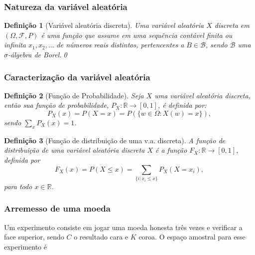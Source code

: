 \documentclass{beamer}
\theoremstyle{plain}
\newtheorem{defi}{Definição}
\begin{document}
\begin{frame}
	\frametitle{Natureza da variável aleatória}
	\begin{defi}[Variável aleatória discreta]
		Uma variável aleatória $X$ discreta em $(\Omega, \mathcal{F}, P)$ é uma função que assume em uma sequência contável finita ou infinita $x_1,x_2,\ldots$ de números reais distintos, pertencentes a $B\in\mathcal{B}$, sendo $\mathcal{B}$ uma $\sigma$-álgebra de Borel.\qed
	\end{defi}
\end{frame}

\begin{frame}
	\frametitle{Caracterização da variável aleatória}
	\begin{defi}[Função de Probabilidade]
		Seja $X$ uma variável aleatória discreta, então sua função de probabilidade, $P_X:\mathbb{R}\rightarrow [0,1]$, é definida por:
		$$
		P_X(x)=P(X=x)=P(\{w\in\Omega:X(w)=x\}),
		$$
		sendo $\sum_xP_X(x)=1$.
	\end{defi}
\end{frame}


\begin{frame}
	\begin{defi}[Função de distribuição de uma v.a. discreta]
		A função de distribuição de uma variável aleatória discreta $X$ é a função $F_X:\mathbb{R}\rightarrow [0,1]$, definida por
		$$
		F_X(x)=P(X\leq x)=\sum_{\{i:x_i\leq x\}}P_X(X=x_i),
		$$
		para todo $x\in\mathbb{R}$.
	\end{defi}
\end{frame}


\begin{frame}
	\frametitle{Arremesso de uma moeda}
	Um experimento consiste em jogar uma moeda honesta três vezes e verificar a face superior, sendo $C$ o resultado cara e $K$ coroa.
	O espaço amostral para esse experimento é
	\begin{center}
	\end{center}
\end{frame}
\end{document}
